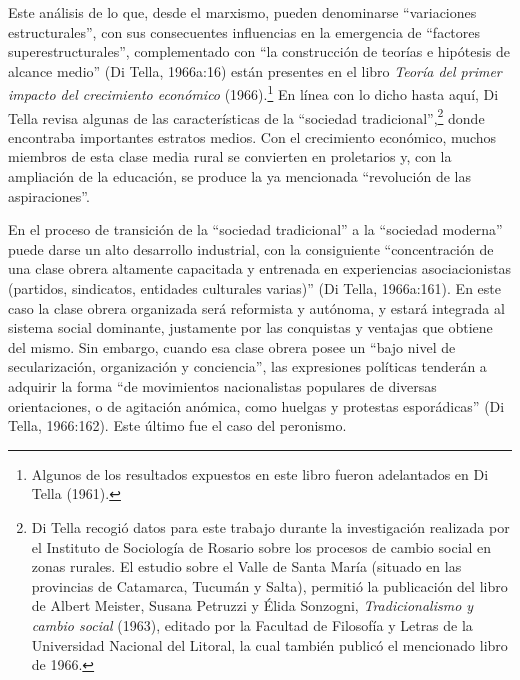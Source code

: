 Este análisis de lo que, desde el marxismo, pueden denominarse ``variaciones estructurales'', con sus consecuentes influencias en la emergencia de ``factores superestructurales'', complementado con ``la construcción de teorías e hipótesis de alcance medio'' (Di Tella, 1966a:16) están presentes en el libro \emph{Teoría del primer impacto del crecimiento económico} (1966).\footnote{Algunos de los resultados expuestos en este libro fueron adelantados en Di Tella (1961).} En línea con lo dicho hasta aquí, Di Tella revisa algunas de las características de la ``sociedad tradicional'',\footnote{Di Tella recogió datos para este trabajo durante la investigación realizada por el Instituto de Sociología de Rosario sobre los procesos de cambio social en zonas rurales. El estudio sobre el Valle de Santa María (situado en las provincias de Catamarca, Tucumán y Salta), permitió la publicación del libro de Albert Meister, Susana Petruzzi y Élida Sonzogni, \emph{Tradicionalismo y cambio social} (1963), editado por la Facultad de Filosofía y Letras de la Universidad Nacional del Litoral, la cual también publicó el mencionado libro de 1966.} donde encontraba importantes estratos medios. Con el crecimiento económico, muchos miembros de esta clase media rural se convierten en proletarios y, con la ampliación de la educación, se produce la ya mencionada ``revolución de las aspiraciones''.

En el proceso de transición de la ``sociedad tradicional'' a la ``sociedad moderna'' puede darse un alto desarrollo industrial, con la consiguiente ``concentración de una clase obrera altamente capacitada y entrenada en experiencias asociacionistas (partidos, sindicatos, entidades culturales varias)'' (Di Tella, 1966a:161). En este caso la clase obrera organizada será reformista y autónoma, y estará integrada al sistema social dominante, justamente por las conquistas y ventajas que obtiene del mismo. Sin embargo, cuando esa clase obrera posee un ``bajo nivel de secularización, organización y conciencia'', las expresiones políticas tenderán a adquirir la forma ``de movimientos nacionalistas populares de diversas orientaciones, o de agitación anómica, como huelgas y protestas esporádicas'' (Di Tella, 1966:162). Este último fue el caso del peronismo.

